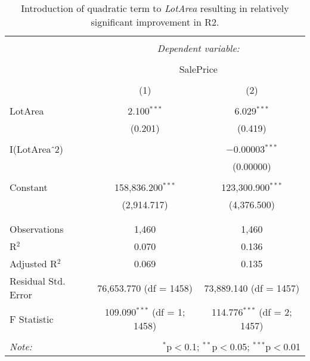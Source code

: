 \documentclass{article}
\begin{document}
\begin{table}[t]
\centering
\caption{\label{tab:quadraticlotarea} Introduction of quadratic term to \emph{LotArea} resulting in relatively significant improvement in R2.}
\begin{tabular}{@{\extracolsep{5pt}}lcc} 
\\[-1.8ex]\hline 
\hline \\[-1.8ex] 
 & \multicolumn{2}{c}{\textit{Dependent variable:}} \\ 
\cline{2-3} 
\\[-1.8ex] & \multicolumn{2}{c}{SalePrice} \\ 
\\[-1.8ex] & (1) & (2)\\ 
\hline \\[-1.8ex] 
 LotArea & 2.100$^{***}$ & 6.029$^{***}$ \\ 
  & (0.201) & (0.419) \\ 
  & & \\ 
 I(LotArea$\hat{\mkern6mu}$2) &  & $-$0.00003$^{***}$ \\ 
  &  & (0.00000) \\ 
  & & \\ 
 Constant & 158,836.200$^{***}$ & 123,300.900$^{***}$ \\ 
  & (2,914.717) & (4,376.500) \\ 
  & & \\ 
\hline \\[-1.8ex] 
Observations & 1,460 & 1,460 \\ 
R$^{2}$ & 0.070 & 0.136 \\ 
Adjusted R$^{2}$ & 0.069 & 0.135 \\ 
Residual Std. Error & 76,653.770 (df = 1458) & 73,889.140 (df = 1457) \\ 
F Statistic & 109.090$^{***}$ (df = 1; 1458) & 114.776$^{***}$ (df = 2; 1457) \\ 
\hline 
\hline \\[-1.8ex] 
\textit{Note:}  & \multicolumn{2}{r}{$^{*}$p$<$0.1; $^{**}$p$<$0.05; $^{***}$p$<$0.01} \\ 
\end{tabular} 
\end{table} 
\end{document}
